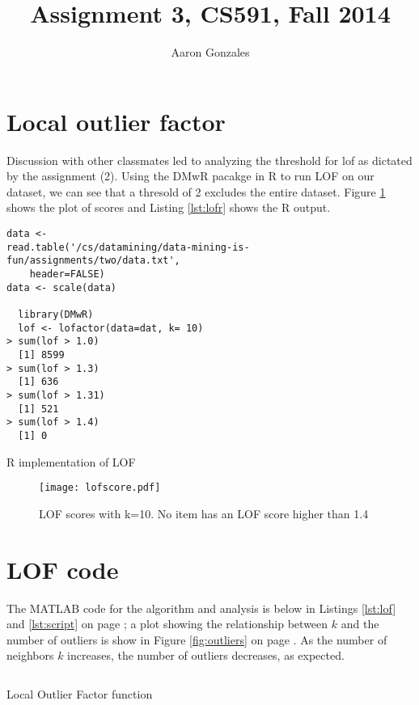 \documentclass[titlepage]{article}\usepackage[]{graphicx}\usepackage[]{color}
\begin{document}
\title{Assignment 3, CS591, Fall 2014}
\author{Aaron Gonzales}
\maketitle



\section{Local outlier factor}
Discussion with other classmates led to analyzing the threshold for lof as
dictated by the assignment (2). Using the DMwR pacakge in R to run LOF on our
dataset, we can see that a thresold of 2 excludes the entire dataset. Figure
\ref{fig:lofscores} shows the plot of scores and Listing \ref{lst:lofr} shows
the R output. 

\begin{listing}
  \begin{verbatim}
data <-
read.table('/cs/datamining/data-mining-is-fun/assignments/two/data.txt',
    header=FALSE)
data <- scale(data)

  library(DMwR)
  lof <- lofactor(data=dat, k= 10)
> sum(lof > 1.0)
  [1] 8599
> sum(lof > 1.3)
  [1] 636
> sum(lof > 1.31)
  [1] 521
> sum(lof > 1.4)
  [1] 0
\end{verbatim}
  \label{lst:lofr}
  \caption{R implementation of LOF}
\end{listing}

\begin{figure}
  \label{fig:lofscores}
  \centering
  \texttt{[image: lofscore.pdf]}
  \caption{LOF scores with k=10. No item has an LOF score higher than 1.4}
\end{figure}

\section{LOF code}
The MATLAB code for the algorithm and analysis is below in Listings
\ref{lst:lof} and \ref{lst:script} on page \pageref{lst:lof}; a plot showing the relationship
between $k$ and the number of outliers is show in Figure \ref{fig:outliers} on
page \pageref{fig:outliers}. As the number of neighbors $k$ increases, the
number of outliers decreases, as expected. 

%
\begin{listing}
  \inputminted[bgcolor=bg]{matlab}{../../lof_ag.m}
\label{lst:lof}
\caption{Local Outlier Factor function}
\end{listing}
\end{document}
